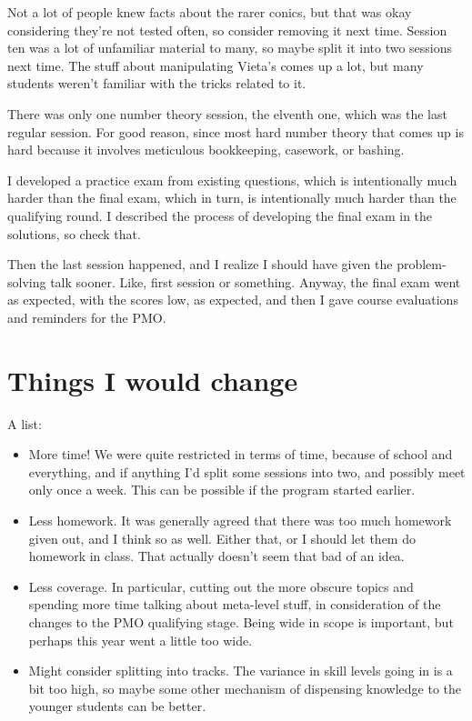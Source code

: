 \documentclass[11pt,paper=letter]{scrartcl}
\begin{document}
Not a lot of people knew facts about the rarer conics, but that was okay considering they're not tested often, so consider removing it next time. Session ten was a lot of unfamiliar material to many, so maybe split it into two sessions next time. The stuff about manipulating Vieta's comes up a lot, but many students weren't familiar with the tricks related to it.

There was only one number theory session, the elventh one, which was the last regular session. For good reason, since most hard number theory that comes up is hard because it involves meticulous bookkeeping, casework, or bashing.

I developed a practice exam from existing questions, which is intentionally much harder than the final exam, which in turn, is intentionally much harder than the qualifying round. I described the process of developing the final exam in the solutions, so check that.

Then the last session happened, and I realize I should have given the problem-solving talk sooner. Like, first session or something. Anyway, the final exam went as expected, with the scores low, as expected, and then I gave course evaluations and reminders for the PMO.

\section{Things I would change}

A list:

\begin{itemize}
  \item More time! We were quite restricted in terms of time, because of school and everything, and if anything I'd split some sessions into two, and possibly meet only once a week. This can be possible if the program started earlier.

  \item Less homework. It was generally agreed that there was too much homework given out, and I think so as well. Either that, or I should let them do homework in class. That actually doesn't seem that bad of an idea.

  \item Less coverage. In particular, cutting out the more obscure topics and spending more time talking about meta-level stuff, in consideration of the changes to the PMO qualifying stage. Being wide in scope is important, but perhaps this year went a little too wide.

  \item Might consider splitting into tracks. The variance in skill levels going in is a bit too high, so maybe some other mechanism of dispensing knowledge to the younger students can be better.
\end{itemize}
\end{document}
